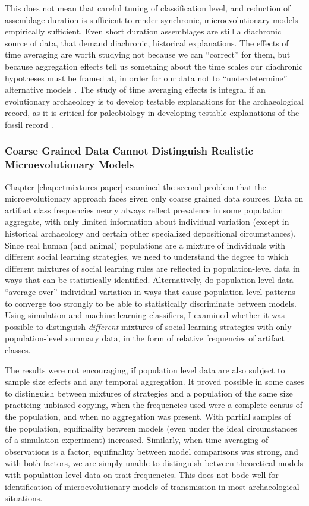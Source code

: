 This does not mean that careful tuning of classification level, and reduction of assemblage duration is sufficient to render synchronic, microevolutionary models empirically sufficient.  Even short duration assemblages are still a diachronic source of data, that demand diachronic, historical explanations.  The effects of time averaging are worth studying not because we can ``correct'' for them, but because aggregation effects tell us something about the time scales our diachronic hypotheses must be framed at, in order for our data not to ``underdetermine'' alternative models \citep{perreault2019quality}.  The study of time averaging effects is integral if an evolutionary archaeology is to develop testable explanations for the archaeological record, as it is critical for paleobiology in developing testable explanations of the fossil record \citep{kowalewski1996time}.


\subsubsection{Coarse Grained Data Cannot Distinguish Realistic Microevolutionary Models}\label{conc:sec:conc-ctmixtures}

Chapter \ref{chap:ctmixtures-paper} examined the second problem that the microevolutionary approach faces given only coarse grained data sources.  Data on artifact class frequencies nearly always reflect prevalence in some population aggregate, with only limited information about individual variation (except in historical archaeology and certain other specialized depositional circumstances). 
Since real human (and animal) populations are a mixture of individuals with different social learning strategies, we need to understand the degree to which different mixtures of social learning rules are reflected in population-level data in ways that can be statistically identified.  Alternatively, do population-level data ``average over'' individual variation in ways that cause population-level patterns to converge too strongly to be able to statistically discriminate between models.
Using simulation and machine learning classifiers, I examined whether it was possible to distinguish \emph{different} mixtures of social learning strategies with only population-level summary data, in the form of relative frequencies of artifact classes.

The results were not encouraging, if population level data are also subject to sample size effects and any temporal aggregation.  It proved possible in some cases to distinguish between mixtures of strategies and a population of the same size practicing unbiased copying, when the frequencies used were a complete census of the population, and when no aggregation was present.  With partial samples of the population, equifinality between models (even under the ideal circumstances of a simulation experiment) increased.  Similarly, when time averaging of observations is a factor, equifinality between model comparisons was strong, and with both factors, we are simply unable to distinguish between theoretical models with population-level data on trait frequencies.  This does not bode well for identification of microevolutionary models of transmission in most archaeological situations.  

